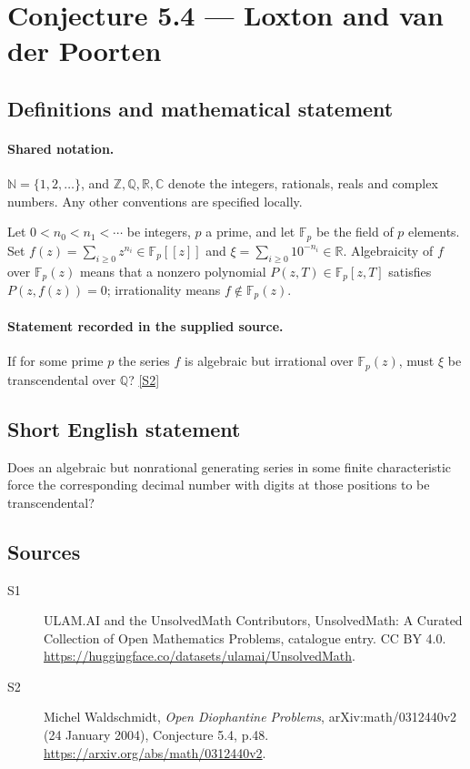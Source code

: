 \documentclass[11pt]{article}
\newcommand{\sref}[2]{\hyperlink{source:#1:#2}{[S#2]}}
\begin{document}
\section{Conjecture 5.4 — Loxton and van der Poorten}\label{statement}

\subsection{Definitions and mathematical statement}

\paragraph{Shared notation.}$\mathbb N=\{1,2,\ldots\}$, and $\mathbb Z,\mathbb Q,\mathbb R,\mathbb C$ denote the integers, rationals, reals and complex numbers. Any other conventions are specified locally.


Let $0<n_0<n_1<\cdots$ be integers, $p$ a prime, and let $\mathbb F_p$ be the field of $p$ elements. Set $f(z)=\sum_{i\ge0}z^{n_i}\in\mathbb F_p[[z]]$ and $\xi=\sum_{i\ge0}10^{-n_i}\in\mathbb R$. Algebraicity of $f$ over $\mathbb F_p(z)$ means that a nonzero polynomial $P(z,T)\in\mathbb F_p[z,T]$ satisfies $P(z,f(z))=0$; irrationality means $f\notin\mathbb F_p(z)$.
\paragraph{Statement recorded in the supplied source.}
If for some prime $p$ the series $f$ is algebraic but irrational over $\mathbb F_p(z)$, must $\xi$ be transcendental over $\mathbb Q$? \sref{statement}{2}

\subsection{Short English statement}
Does an algebraic but nonrational generating series in some finite characteristic force the corresponding decimal number with digits at those positions to be transcendental?
\subsection{Sources}
\begin{description}
\item[\hypertarget{source:statement:1}{S1}] ULAM.AI and the UnsolvedMath Contributors, UnsolvedMath: A Curated Collection of Open Mathematics Problems, catalogue entry. CC BY 4.0. \url{https://huggingface.co/datasets/ulamai/UnsolvedMath}.
\item[\hypertarget{source:statement:2}{S2}] Michel Waldschmidt, \emph{Open Diophantine Problems}, arXiv:math/0312440v2 (24 January 2004), Conjecture 5.4, p.48. \url{https://arxiv.org/abs/math/0312440v2}.
\end{description}
\label{end:statement}
\end{document}

